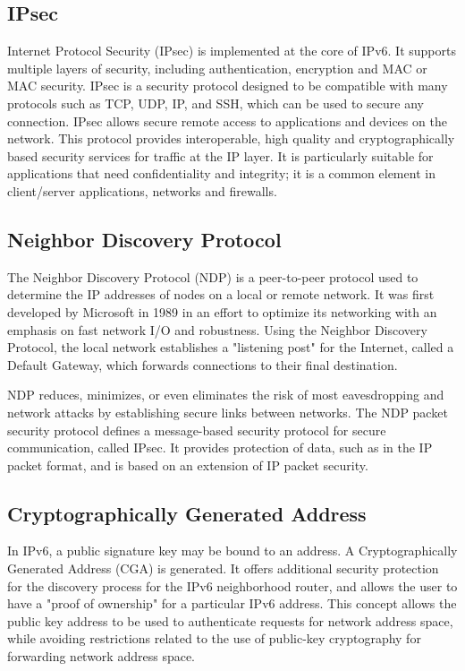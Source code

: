 \documentclass[conference,12pt]{IEEEtran}
\begin{document}
\subsection{IPsec}
Internet Protocol Security (IPsec) is implemented at the core of IPv6. It supports multiple layers of security, including authentication, encryption and MAC or MAC security. IPsec is a security protocol designed to be compatible with many protocols such as TCP, UDP, IP, and SSH, which can be used to secure any connection. IPsec allows secure remote access to applications and devices on the network. This protocol provides interoperable, high quality and cryptographically based security services for traffic at the IP layer. It is particularly suitable for applications that need confidentiality and integrity; it is a common element in client/server applications, networks and firewalls.

\subsection{Neighbor Discovery Protocol}
The Neighbor Discovery Protocol (NDP) is a peer-to-peer protocol used to determine the IP addresses of nodes on a local or remote network. It was first developed by Microsoft in 1989 in an effort to optimize its networking with an emphasis on fast network I/O and robustness. Using the Neighbor Discovery Protocol, the local network establishes a "listening post" for the Internet, called a Default Gateway, which forwards connections to their final destination.

NDP reduces, minimizes, or even eliminates the risk of most eavesdropping and network attacks by establishing secure links between networks. The NDP packet security protocol defines a message-based security protocol for secure communication, called IPsec. It provides protection of data, such as in the IP packet format, and is based on an extension of IP packet security.

\subsection{Cryptographically Generated Address}
In IPv6, a public signature key may be bound to an address. A Cryptographically Generated Address (CGA) is generated. It offers additional security protection for the discovery process for the IPv6 neighborhood router, and allows the user to have a "proof of ownership" for a particular IPv6 address. This concept allows the public key address to be used to authenticate requests for network address space, while avoiding restrictions related to the use of public-key cryptography for forwarding network address space.\\
\end{document}

